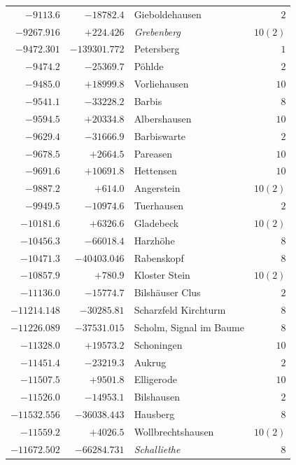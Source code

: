 \begin{center}
\begin{tabular}{r|r|p{170pt}|r}
\(-9113.6\)&\(-18782.4\)&Gieboldehausen&\(2\)\\
\(-9267.916\)&\(+224.426\)&\textit{Grebenberg}&\(10 (2)\)\\
\(-9472.301\)&\(-139301.772\)&Petersberg&\(1\)\\
\(-9474.2\)&\(-25369.7\)&Pöhlde&\(2\)\\
\(-9485.0\)&\(+18999.8\)&Vorliehausen&\(10\)\\
\(-9541.1\)&\(-33228.2\)&Barbis&\(8\)\\
\(-9594.5\)&\(+20334.8\)&Albershausen&\(10\)\\
\(-9629.4\)&\(-31666.9\)&Barbiswarte&\(2\)\\
\(-9678.5\)&\(+2664.5\)&Pareasen&\(10\)\\
\(-9691.6\)&\(+10691.8\)&Hettensen&\(10\)\\
\(-9887.2\)&\(+614.0\)&Angerstein&\(10 (2)\)\\
\(-9949.5\)&\(-10974.6\)&Tuerhausen&\(2\)\\
\(-10181.6\)&\(+6326.6\)&Gladebeck&\(10 (2)\)\\
\(-10456.3\)&\(-66018.4\)&Harzhöhe&\(8\)\\
\(-10471.3\)&\(-40403.046\)&Rabenskopf&\(8\)\\
\(-10857.9\)&\(+780.9\)&Kloster Stein&\(10 (2)\)\\
\(-11136.0\)&\(-15774.7\)&Bilshäuser Clus&\(2\)\\
\(-11214.148\)&\(-30285.81\)&Scharzfeld Kirchturm&\(8\)\\
\(-11226.089\)&\(-37531.015\)&Scholm, Signal im Baume&\(8\)\\
\(-11328.0\)&\(+19573.2\)&Schoningen&\(10\)\\
\(-11451.4\)&\(-23219.3\)&Aukrug&\(2\)\\
\(-11507.5\)&\(+9501.8\)&Elligerode&\(10\)\\
\(-11526.0\)&\(-14953.1\)&Bilshausen&\(2\)\\
\(-11532.556\)&\(-36038.443\)&Hausberg&\(8\)\\
\(-11559.2\)&\(+4026.5\)&Wollbrechtshausen&\(10 (2)\)\\
\(-11672.502\)&\(-66284.731\)&\textit{Schalliethe}&\(8\)\\
\hline\end{tabular}\endgroup\end{center}
